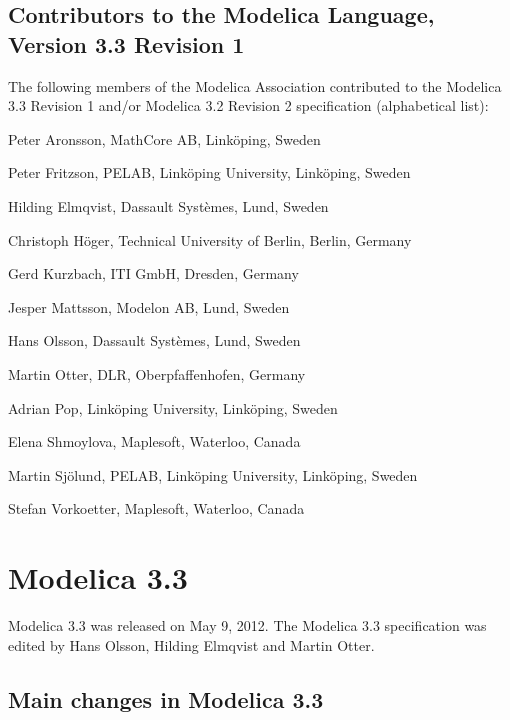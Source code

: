 \subsection{Contributors to the Modelica Language, Version 3.3 Revision 1}\label{contributors-to-the-modelica-language-version-3-3-revision-1}

The following members of the Modelica Association contributed to the
Modelica 3.3 Revision 1 and/or Modelica 3.2 Revision 2 specification
(alphabetical list):
\begin{contributors}
\item Peter Aronsson, MathCore AB, Linköping, Sweden
\item Peter Fritzson, PELAB, Linköping University, Linköping, Sweden
\item Hilding Elmqvist, Dassault Systèmes, Lund, Sweden
\item Christoph Höger, Technical University of Berlin, Berlin, Germany
\item Gerd Kurzbach, ITI GmbH, Dresden, Germany
\item Jesper Mattsson, Modelon AB, Lund, Sweden
\item Hans Olsson, Dassault Systèmes, Lund, Sweden
\item Martin Otter, DLR, Oberpfaffenhofen, Germany
\item Adrian Pop, Linköping University, Linköping, Sweden
\item Elena Shmoylova, Maplesoft, Waterloo, Canada
\item Martin Sjölund, PELAB, Linköping University, Linköping, Sweden
\item Stefan Vorkoetter, Maplesoft, Waterloo, Canada
\end{contributors}

\section{Modelica 3.3}\label{modelica-3-3}

Modelica 3.3 was released on May 9, 2012. The Modelica 3.3 specification
was edited by Hans Olsson, Hilding Elmqvist and Martin Otter.

\subsection{Main changes in Modelica 3.3}\label{main-changes-in-modelica-3-3}

